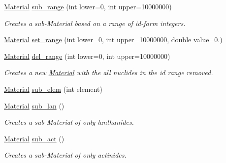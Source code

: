 \begin{DoxyCompactItemize}
\item 
\mbox{\label{classpyne_1_1_material_ae7abcf8bf30eb3b2ec862df46e792865}} 
\hyperlink{classpyne_1_1_material}{Material} \hyperlink{classpyne_1_1_material_ae7abcf8bf30eb3b2ec862df46e792865}{sub\+\_\+range} (int lower=0, int upper=10000000)
\begin{DoxyCompactList}\small\item\em Creates a sub-\/\+Material based on a range of id-\/form integers. \end{DoxyCompactList}\item 
\hyperlink{classpyne_1_1_material}{Material} \hyperlink{classpyne_1_1_material_af81eb0e8c7f65792bc699c4aec82bb7e}{set\+\_\+range} (int lower=0, int upper=10000000, double value=0.)
\item 
\mbox{\label{classpyne_1_1_material_a2e5387cd2fb1dea7bf6fdd567529ae6f}} 
\hyperlink{classpyne_1_1_material}{Material} \hyperlink{classpyne_1_1_material_a2e5387cd2fb1dea7bf6fdd567529ae6f}{del\+\_\+range} (int lower=0, int upper=10000000)
\begin{DoxyCompactList}\small\item\em Creates a new \hyperlink{classpyne_1_1_material}{Material} with the all nuclides in the id range removed. \end{DoxyCompactList}\item 
\hyperlink{classpyne_1_1_material}{Material} \hyperlink{classpyne_1_1_material_aa38cb12439e08391849d41f803f03495}{sub\+\_\+elem} (int element)
\item 
\mbox{\label{classpyne_1_1_material_ad5f4191cb47a820be447e0a4b70da96c}} 
\hyperlink{classpyne_1_1_material}{Material} \hyperlink{classpyne_1_1_material_ad5f4191cb47a820be447e0a4b70da96c}{sub\+\_\+lan} ()
\begin{DoxyCompactList}\small\item\em Creates a sub-\/\+Material of only lanthanides. \end{DoxyCompactList}\item 
\mbox{\label{classpyne_1_1_material_addb8d9eb230f9782ebf2f5381c35ccde}} 
\hyperlink{classpyne_1_1_material}{Material} \hyperlink{classpyne_1_1_material_addb8d9eb230f9782ebf2f5381c35ccde}{sub\+\_\+act} ()
\begin{DoxyCompactList}\small\item\em Creates a sub-\/\+Material of only actinides. \end{DoxyCompactList}\item 

\end{DoxyCompactItemize}
